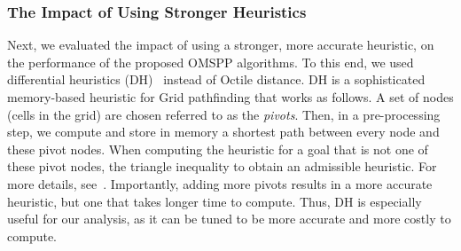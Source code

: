 \documentclass[smallextended]{svjour3}       %
\newcommand{\omspp}{\ac{OMSPP}\xspace}
\newcommand{\kastarvar}[1]{\textup{kA}$^*_{#1}$\xspace}
\newcommand{\kastarmin}{\kastarvar{\min}}
\newcommand{\kxastar}{k$\times$A$^*$\xspace}
\begin{document}
\subsubsection{The Impact of Using Stronger Heuristics}


Next, we evaluated the impact of using a stronger, more accurate heuristic, on the performance of the proposed \omspp algorithms.
To this end, we used differential heuristics (DH)~\cite{goldberg2005computing,ng2002predicting,SturtevantFBSN2009} instead of Octile distance.
DH is a sophisticated memory-based heuristic for Grid pathfinding that works as follows.
A set of nodes (cells in the grid) are chosen  referred to as the \emph{pivots}. 
Then, in a pre-processing step, we compute and store in memory a shortest path between every node and these pivot nodes. 
When computing the heuristic for a goal that is not one of these pivot nodes, the triangle inequality to obtain an admissible heuristic. 
For more details, see~\cite{goldberg2005computing,ng2002predicting,SturtevantFBSN2009}. Importantly, adding more pivots results in a more accurate heuristic, but one that takes longer time to compute. Thus, DH is especially useful for our analysis, as it can be tuned to be more accurate and more costly to compute.
\end{document}
